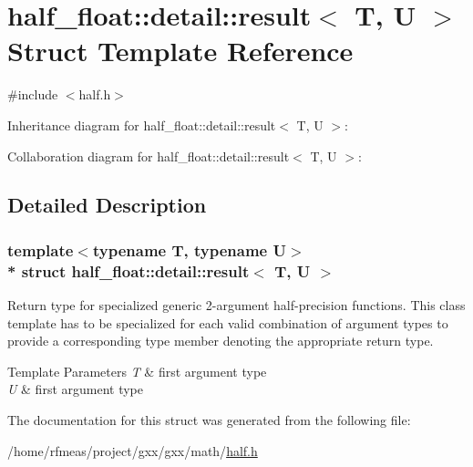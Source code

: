 \hypertarget{structhalf__float_1_1detail_1_1result}{}\section{half\+\_\+float\+:\+:detail\+:\+:result$<$ T, U $>$ Struct Template Reference}
\label{structhalf__float_1_1detail_1_1result}


{\ttfamily \#include $<$half.\+h$>$}



Inheritance diagram for half\+\_\+float\+:\+:detail\+:\+:result$<$ T, U $>$\+:


Collaboration diagram for half\+\_\+float\+:\+:detail\+:\+:result$<$ T, U $>$\+:


\subsection{Detailed Description}
\subsubsection*{template$<$typename T, typename U$>$\\*
struct half\+\_\+float\+::detail\+::result$<$ T, U $>$}

Return type for specialized generic 2-\/argument half-\/precision functions. This class template has to be specialized for each valid combination of argument types to provide a corresponding {\ttfamily type} member denoting the appropriate return type. 
\begin{DoxyTemplParams}{Template Parameters}
{\em T} & first argument type \\
\hline
{\em U} & first argument type \\
\hline
\end{DoxyTemplParams}


The documentation for this struct was generated from the following file\+:\begin{DoxyCompactItemize}
\item 
/home/rfmeas/project/gxx/gxx/math/\hyperlink{half_8h}{half.\+h}\end{DoxyCompactItemize}
